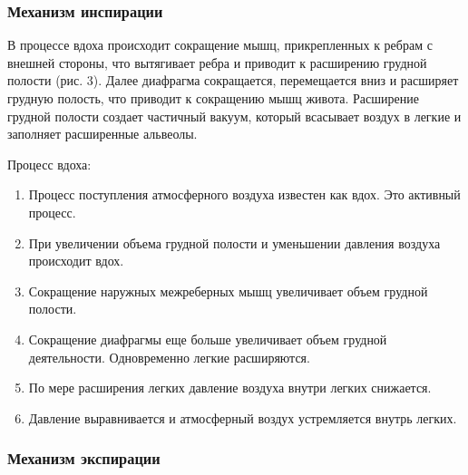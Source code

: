 \documentclass{article}
\begin{document}
        \subsubsection*{Механизм инспирации}

            \hspace*{4mm} В процессе вдоха происходит сокращение мышц, прикрепленных к ребрам
            с внешней стороны, что вытягивает ребра и приводит к расширению грудной
            полости (рис. 3). Далее диафрагма сокращается, перемещается вниз и
            расширяет грудную полость, что приводит к сокращению мышц живота.
            Расширение грудной полости создает частичный вакуум, который всасывает
            воздух в легкие и заполняет расширенные альвеолы.            
            \vspace*{4mm}

            Процесс вдоха:

            \begin{enumerate}
                \item Процесс поступления атмосферного воздуха известен как вдох. Это
                активный процесс.

                \item При увеличении объема грудной полости и уменьшении давления
                воздуха происходит вдох.

                \item Сокращение наружных межреберных мышц увеличивает объем грудной
                полости.

                \item Сокращение диафрагмы еще больше увеличивает объем грудной
                деятельности. Одновременно легкие расширяются.

                \item По мере расширения легких давление воздуха внутри легких снижается.
                
                \item Давление выравнивается и атмосферный воздух устремляется внутрь
                легких.
            \end{enumerate}

        \subsubsection*{Механизм экспирации}
\end{document}
